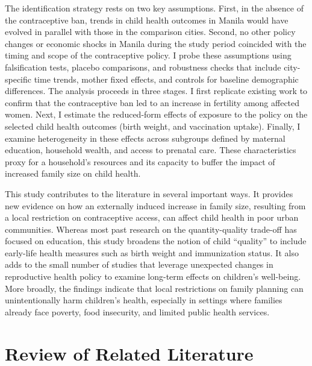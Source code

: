 \documentclass[]{AEA}
\begin{document}
The identification strategy rests on two key assumptions. First, in the
absence of the contraceptive ban, trends in child health outcomes in
Manila would have evolved in parallel with those in the comparison
cities. Second, no other policy changes or economic shocks in Manila
during the study period coincided with the timing and scope of the
contraceptive policy. I probe these assumptions using falsification
tests, placebo comparisons, and robustness checks that include
city-specific time trends, mother fixed effects, and controls for
baseline demographic differences. The analysis proceeds in three stages.
I first replicate existing work \citep{dumas2019sex} to confirm that the
contraceptive ban led to an increase in fertility among affected women.
Next, I estimate the reduced-form effects of exposure to the policy on
the selected child health outcomes (birth weight, and vaccination
uptake). Finally, I examine heterogeneity in these effects across
subgroups defined by maternal education, household wealth, and access to
prenatal care. These characteristics proxy for a household's resources
and its capacity to buffer the impact of increased family size on child
health.

This study contributes to the literature in several important ways. It
provides new evidence on how an externally induced increase in family
size, resulting from a local restriction on contraceptive access, can
affect child health in poor urban communities. Whereas most past
research on the quantity-quality trade-off has focused on education,
this study broadens the notion of child ``quality'' to include
early-life health measures such as birth weight and immunization status.
It also adds to the small number of studies that leverage unexpected
changes in reproductive health policy to examine long-term effects on
children's well-being. More broadly, the findings indicate that local
restrictions on family planning can unintentionally harm children's
health, especially in settings where families already face poverty, food
insecurity, and limited public health services.

\section{Review of Related Literature}
\end{document}
